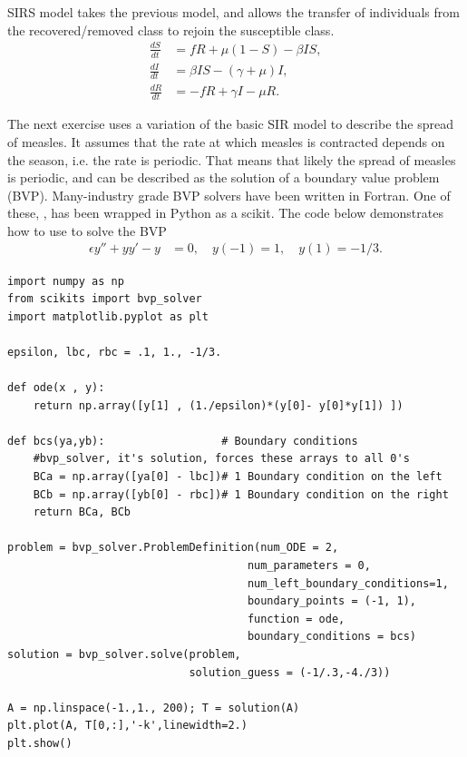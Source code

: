 SIRS model takes the previous model, and allows the transfer of individuals from the recovered/removed class to rejoin the susceptible class. 
\begin{align*}
\frac{dS}{dt} &= fR + \mu(1 -S) - \beta I S,\\
\frac{dI}{dt} &= \beta I S - (\gamma + \mu)I, \\
\frac{dR}{dt} &= -fR + \gamma I - \mu R.
\end{align*}

The next exercise uses a variation of the basic SIR model to describe the spread of measles. 
It assumes that the rate at which measles is contracted depends on the season, i.e. the rate is periodic. That means that likely the spread of measles is periodic, and can be described as the solution of a boundary value problem (BVP).
Many-industry grade BVP solvers have been written in Fortran. One of these, , has been wrapped in Python as a scikit. The code below demonstrates how to use  to solve the BVP
\begin{align*}
	\epsilon y'' + yy' - y &= 0, \quad y(-1) = 1, \quad y(1) = -1/3.
\end{align*}

\begin{lstlisting}
import numpy as np
from scikits import bvp_solver
import matplotlib.pyplot as plt

epsilon, lbc, rbc = .1, 1., -1/3.

def ode(x , y):
	return np.array([y[1] , (1./epsilon)*(y[0]- y[0]*y[1]) ]) 

def bcs(ya,yb): 				 # Boundary conditions
    #bvp_solver, it's solution, forces these arrays to all 0's
	BCa = np.array([ya[0] - lbc])# 1 Boundary condition on the left
	BCb = np.array([yb[0] - rbc])# 1 Boundary condition on the right
	return BCa, BCb

problem = bvp_solver.ProblemDefinition(num_ODE = 2,
                                     num_parameters = 0,
                                     num_left_boundary_conditions=1,
                                     boundary_points = (-1, 1),
                                     function = ode,
                                     boundary_conditions = bcs)
solution = bvp_solver.solve(problem,
                            solution_guess = (-1/.3,-4./3))

A = np.linspace(-1.,1., 200); T = solution(A)
plt.plot(A, T[0,:],'-k',linewidth=2.)
plt.show()

\end{lstlisting}

